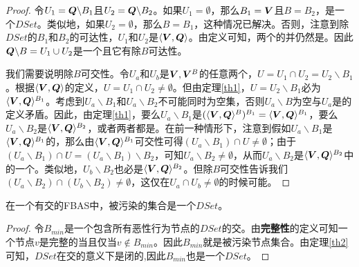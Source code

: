 \begin{proof}
	令$U_1={\bm Q}\backslash B_1$且$U_2={\bm Q}\backslash B_2$。如果$U_1=\emptyset$，那么$B_1={\bm V}$且$B=B_2$，是一个$DSet$。类似地，如果$U_2=\emptyset$，那么$B=B_1$，这种情况已解决。否则，注意到除$DSet$的$B_1$和$B_2$的{\quorum}可达性，$U_1$和$U_2$是$\langle{\bm V},{\bm Q}\rangle$。由定义可知，两个{\quorum}的并仍然是{\quorum}。因此${{\bm Q}\backslash B}=U_1\cup U_2$是一个{\quorum}且它有除$B${\quorum}可达性。
	
	我们需要说明除$B${\quorum}可交性。令$U_a$和$U_b$是${{\bm V},{\bm V}^{B}}$的任意两个{\quorum}，$U=U_1\cap U_2 = U_2\backslash B_1$。根据$\langle{\bm V},{\bm Q}\rangle$的定义，$U=U_1\cap U_2  \neq \emptyset$。但由定理\ref{th1}，$U=U_2\backslash B_1$必为$\langle{\bm V},{\bm Q}\rangle^{B_1}$。考虑到$U_a\backslash B_1$和$U_a\backslash B_2$不可能同时为空集，否则$U_a\backslash B$为空与$U_a$是{\quorum}的定义矛盾。因此，由定理\ref{th1}，要么$U_a\backslash B_1$是$(\langle{\bm V},{\bm Q}\rangle^{B})^{B_1}=\langle{\bm V},{\bm Q}\rangle^{B_1}$，要么$U_a\backslash B_2$是$\langle{\bm V},{\bm Q}\rangle^{B_2}$，或者两者都是。在前一种情形下，注意到假如$U_a\backslash B_1$是$\langle{\bm V},{\bm Q}\rangle^{B_1}$的{\quorum}，那么由$\langle{\bm V},{\bm Q}\rangle^{B_1}${\quorum}可交性可得$(U_a\backslash B_1)\cap U\neq \emptyset$；由于$(U_a\backslash B_1)\cap U = (U_a\backslash B_1)\backslash B_2$，可知$U_a\backslash B_2\neq \emptyset$，从而$U_a\backslash B_2$是$\langle{\bm V},{\bm Q}\rangle^{B_2}$中的一个{\quorum}。类似地，$U_b\backslash B_2$也必是$\langle{\bm V},{\bm Q}\rangle^{B_2}$。但除$B${\quorum}可交性告诉我们$(U_a\backslash B_2)\cap (U_b\backslash B_2)\neq \emptyset$，这仅在$U_a\cap U_b\neq \emptyset$的时候可能。
\end{proof}

\begin{theorem}
	在一个有{\quorum}交的FBAS中，被污染的集合是一个$DSet$。
\end{theorem}

\begin{proof}
	令$B_{min}$是一个包含所有恶性行为节点的$DSet$的交。由\textbf{完整性}的定义可知一个节点$v$是完整的当且仅当$v\not\in B_{min}$。因此$B_{min}$就是被污染节点集合。由定理\ref{th2}可知，$DSet$在交的意义下是闭的,因此$B_{min}$也是一个$DSet$。
\end{proof}